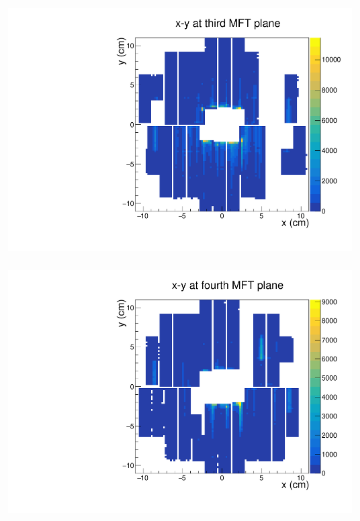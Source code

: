 \begin{figure}[h]
\begin{subfigure}[t]{.49\linewidth}
        \includegraphics[width=\linewidth]{Plots/pass4_MFT/x_y_3_pass4.pdf}
        \caption{}
        \label{}
    \end{subfigure}
    \hfill
    \begin{subfigure}[t]{.49\linewidth}
        \centering
        \includegraphics[width=\linewidth]{Plots/pass4_MFT/x_y_4_pass4.pdf}
        \caption{}
        \label{}
    \end{subfigure}
\caption{}
\label{fig:MFT_2D_pass4}
\end{figure}
